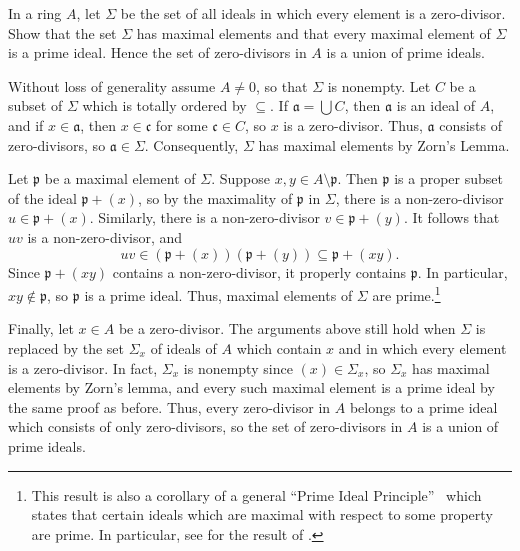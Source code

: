 \begin{exercise}
In a ring \(A\), let \(\Sigma\) be the set of all ideals in which every element is a zero-divisor.
Show that the set \(\Sigma\) has maximal elements and that every maximal element of \(\Sigma\) is a prime ideal.
Hence the set of zero-divisors in \(A\) is a union of prime ideals.
\end{exercise}

\begin{solution}
Without loss of generality assume \(A \neq 0\), so that \(\Sigma\) is nonempty.
Let \(C\) be a subset of \(\Sigma\) which is totally ordered by \(\subseteq\).
If \(\mathfrak{a} = \bigcup C\), then \(\mathfrak{a}\) is an ideal of \(A\), and if \(x \in \mathfrak{a}\), then \(x \in \mathfrak{c}\) for some \(\mathfrak{c} \in C\), so \(x\) is a zero-divisor.
Thus, \(\mathfrak{a}\) consists of zero-divisors, so \(\mathfrak{a} \in \Sigma\).
Consequently, \(\Sigma\) has maximal elements by Zorn's Lemma.

Let \(\mathfrak{p}\) be a maximal element of \(\Sigma\).
Suppose \(x, y \in A \setminus \mathfrak{p}\).
Then \(\mathfrak{p}\) is a proper subset of the ideal \(\mathfrak{p} + (x)\), so by the maximality of \(\mathfrak{p}\) in \(\Sigma\), there is a non-zero-divisor \(u \in \mathfrak{p} + (x)\).
Similarly, there is a non-zero-divisor \(v \in \mathfrak{p} + (y)\).
It follows that \(u v\) is a non-zero-divisor, and
\begin{equation*}
u v \in (\mathfrak{p} + (x)) (\mathfrak{p} + (y)) \subseteq \mathfrak{p} + (x y).
\end{equation*}
Since \(\mathfrak{p} + (x y)\) contains a non-zero-divisor, it properly contains \(\mathfrak{p}\).
In particular, \(x y \notin \mathfrak{p}\), so \(\mathfrak{p}\) is a prime ideal.
Thus, maximal elements of \(\Sigma\) are prime.\footnote{%
This result is also a corollary of a general ``Prime Ideal Principle''~\cite{LamReyesPrimeIdealPrinciple} which states that certain ideals which are maximal with respect to some property are prime.
In particular, see \cite[Corollary~3.2]{LamReyesPrimeIdealPrinciple} for the result of .%
}

Finally, let \(x \in A\) be a zero-divisor.
The arguments above still hold when \(\Sigma\) is replaced by the set \(\Sigma_x\) of ideals of \(A\) which contain \(x\) and in which every element is a zero-divisor.
In fact, \(\Sigma_x\) is nonempty since \((x) \in \Sigma_x\), so \(\Sigma_x\) has maximal elements by Zorn's lemma, and every such maximal element is a prime ideal by the same proof as before.
Thus, every zero-divisor in \(A\) belongs to a prime ideal which consists of only zero-divisors, so the set of zero-divisors in \(A\) is a union of prime ideals.
\end{solution}